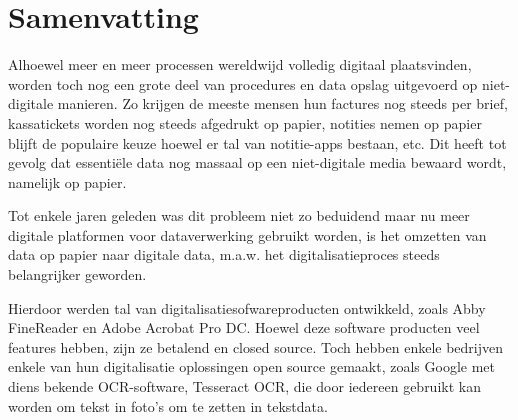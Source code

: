 
%
%




\chapter*{Samenvatting}

Alhoewel meer en meer processen wereldwijd volledig digitaal plaatsvinden, worden toch nog een grote deel van procedures en data opslag uitgevoerd op niet-digitale manieren. Zo krijgen de meeste mensen hun factures nog steeds per brief, kassatickets worden nog steeds afgedrukt op papier, notities nemen op papier blijft de populaire keuze hoewel er tal van notitie-apps bestaan, etc. Dit heeft tot gevolg dat essentiële data nog massaal op een niet-digitale media bewaard wordt, namelijk op papier.

Tot enkele jaren geleden was dit probleem niet zo beduidend maar nu meer digitale platformen voor dataverwerking gebruikt worden, is het omzetten van data op papier naar digitale data, m.a.w. het digitalisatieproces steeds belangrijker geworden. 

Hierdoor werden tal van digitalisatiesofwareproducten ontwikkeld, zoals Abby FineReader en Adobe Acrobat Pro DC. Hoewel deze software producten veel features hebben, zijn ze betalend en closed source. Toch hebben enkele bedrijven enkele van hun digitalisatie oplossingen open source gemaakt, zoals Google met diens bekende OCR-software, Tesseract OCR, die door iedereen gebruikt kan worden om tekst in foto's om te zetten in tekstdata. 



